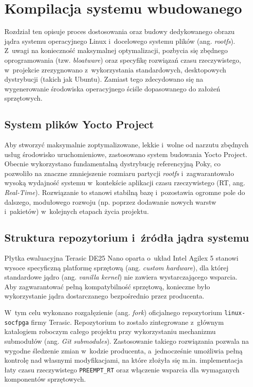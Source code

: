 \chapter{Kompilacja systemu wbudowanego}
\label{ch:kompilacja}

Rozdział ten opisuje proces dostosowania oraz budowy dedykowanego obrazu jądra systemu operacyjnego Linux i~docelowego systemu plików (ang. \textit{rootfs}). Z~uwagi na konieczność maksymalnej optymalizacji, pozbycia się zbędnego oprogramowania (tzw. \textit{bloatware}) oraz specyfikę rozwiązań czasu rzeczywistego, w~projekcie zrezygnowano z~wykorzystania standardowych, desktopowych dystrybucji (takich jak Ubuntu). Zamiast tego zdecydowano się na wygenerowanie środowiska operacyjnego ściśle dopasowanego do założeń sprzętowych.

\section{System plików Yocto Project}
Aby stworzyć maksymalnie zoptymalizowane, lekkie i~wolne od narzutu zbędnych usług środowisko uruchomieniowe, zastosowano system budowania Yocto Project. Obecnie wykorzystano fundamentalną dystrybucję referencyjną Poky, co pozwoliło na znaczne zmniejszenie rozmiaru partycji \textit{rootfs} i~zagwarantowało wysoką wydajność systemu w~kontekście aplikacji czasu rzeczywistego (RT, ang. \textit{Real-Time}). Rozwiązanie to stanowi stabilną bazę i~pozostawia ogromne pole do dalszego, modułowego rozwoju (np. poprzez dodawanie nowych warstw i~pakietów) w~kolejnych etapach życia projektu.

\section{Struktura repozytorium i~źródła jądra systemu}
Płytka ewaluacyjna Terasic DE25 Nano oparta o~układ Intel Agilex 5 stanowi wysoce specyficzną platformę sprzętową (ang. \textit{custom hardware}), dla której standardowe jądro (ang. \textit{vanilla kernel}) nie zawiera wystarczającego wsparcia. Aby zagwarantować pełną kompatybilność sprzętową, konieczne było wykorzystanie jądra dostarczanego bezpośrednio przez producenta.

W~tym celu wykonano rozgałęzienie (ang. \textit{fork}) oficjalnego repozytorium \texttt{linux-socfpga} firmy Terasic. Repozytorium to zostało zintegrowane z~głównym katalogiem roboczym całego projektu przy wykorzystaniu mechanizmu submodułów (ang. \textit{Git submodules}). Zastosowanie takiego rozwiązania pozwala na wygodne śledzenie zmian w~kodzie producenta, a~jednocześnie umożliwia pełną kontrolę nad własnymi modyfikacjami, na które złożyła się m.in. implementacja łaty czasu rzeczywistego \texttt{PREEMPT\_RT} oraz włączenie wsparcia dla wymaganych komponentów sprzętowych.

